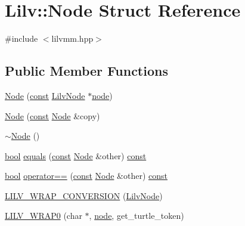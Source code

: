 \hypertarget{struct_lilv_1_1_node}{}\section{Lilv\+:\+:Node Struct Reference}
\label{struct_lilv_1_1_node}


{\ttfamily \#include $<$lilvmm.\+hpp$>$}

\subsection*{Public Member Functions}
\begin{DoxyCompactItemize}
\item 
\hyperlink{struct_lilv_1_1_node_ac6c00309806b5c37564fcc7c0525c3e3}{Node} (\hyperlink{getopt1_8c_a2c212835823e3c54a8ab6d95c652660e}{const} \hyperlink{lilv_8h_ae183dca3dca5368d34dbd863a405437b}{Lilv\+Node} $\ast$\hyperlink{structnode}{node})
\item 
\hyperlink{struct_lilv_1_1_node_a6668ce7816a10c34952a746787afd4e8}{Node} (\hyperlink{getopt1_8c_a2c212835823e3c54a8ab6d95c652660e}{const} \hyperlink{struct_lilv_1_1_node}{Node} \&copy)
\item 
\hyperlink{struct_lilv_1_1_node_a016bcecb281e1eeaaf8975f63e9bdda6}{$\sim$\+Node} ()
\item 
\hyperlink{mac_2config_2i386_2lib-src_2libsoxr_2soxr-config_8h_abb452686968e48b67397da5f97445f5b}{bool} \hyperlink{struct_lilv_1_1_node_ac3e80ecde6110acc4659d0374d4be80a}{equals} (\hyperlink{getopt1_8c_a2c212835823e3c54a8ab6d95c652660e}{const} \hyperlink{struct_lilv_1_1_node}{Node} \&other) \hyperlink{getopt1_8c_a2c212835823e3c54a8ab6d95c652660e}{const} 
\item 
\hyperlink{mac_2config_2i386_2lib-src_2libsoxr_2soxr-config_8h_abb452686968e48b67397da5f97445f5b}{bool} \hyperlink{struct_lilv_1_1_node_a8fd4a9d538cf80978c6a5a6608a17451}{operator==} (\hyperlink{getopt1_8c_a2c212835823e3c54a8ab6d95c652660e}{const} \hyperlink{struct_lilv_1_1_node}{Node} \&other) \hyperlink{getopt1_8c_a2c212835823e3c54a8ab6d95c652660e}{const} 
\item 
\hyperlink{struct_lilv_1_1_node_a678b5af3f8b5c49614cbf20f1e3d98ad}{L\+I\+L\+V\+\_\+\+W\+R\+A\+P\+\_\+\+C\+O\+N\+V\+E\+R\+S\+I\+ON} (\hyperlink{lilv_8h_ae183dca3dca5368d34dbd863a405437b}{Lilv\+Node})
\item 
\hyperlink{struct_lilv_1_1_node_a6241ec35b1a2eeb3ad3371486bed1513}{L\+I\+L\+V\+\_\+\+W\+R\+A\+P0} (char $\ast$, \hyperlink{structnode}{node}, get\+\_\+turtle\+\_\+token)

\end{DoxyCompactItemize}
